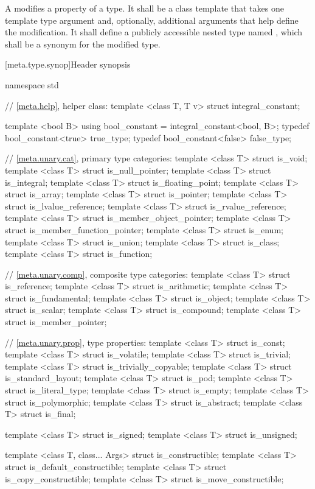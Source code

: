 \pnum
A 
modifies a property
of a type. It shall be a class template that takes one
template type argument and, optionally, additional arguments that help
define the modification. It shall define a publicly accessible nested type
named , which shall be a synonym for the modified type.

[meta.type.synop]{Header  synopsis}
\begin{codeblock}
namespace std {
  // \ref{meta.help}, helper class:
  template <class T, T v> struct integral_constant;

  template <bool B>
    using bool_constant = integral_constant<bool, B>;
  typedef bool_constant<true> true_type;
  typedef bool_constant<false> false_type;

  // \ref{meta.unary.cat}, primary type categories:
  template <class T> struct is_void;
  template <class T> struct is_null_pointer;
  template <class T> struct is_integral;
  template <class T> struct is_floating_point;
  template <class T> struct is_array;
  template <class T> struct is_pointer;
  template <class T> struct is_lvalue_reference;
  template <class T> struct is_rvalue_reference;
  template <class T> struct is_member_object_pointer;
  template <class T> struct is_member_function_pointer;
  template <class T> struct is_enum;
  template <class T> struct is_union;
  template <class T> struct is_class;
  template <class T> struct is_function;

  // \ref{meta.unary.comp}, composite type categories:
  template <class T> struct is_reference;
  template <class T> struct is_arithmetic;
  template <class T> struct is_fundamental;
  template <class T> struct is_object;
  template <class T> struct is_scalar;
  template <class T> struct is_compound;
  template <class T> struct is_member_pointer;

  // \ref{meta.unary.prop}, type properties:
  template <class T> struct is_const;
  template <class T> struct is_volatile;
  template <class T> struct is_trivial;
  template <class T> struct is_trivially_copyable;
  template <class T> struct is_standard_layout;
  template <class T> struct is_pod;
  template <class T> struct is_literal_type;
  template <class T> struct is_empty;
  template <class T> struct is_polymorphic;
  template <class T> struct is_abstract;
  template <class T> struct is_final;

  template <class T> struct is_signed;
  template <class T> struct is_unsigned;

  template <class T, class... Args> struct is_constructible;
  template <class T> struct is_default_constructible;
  template <class T> struct is_copy_constructible;
  template <class T> struct is_move_constructible;

}
\end{codeblock}
